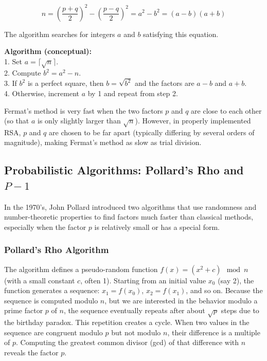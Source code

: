 \[
n = \left(\frac{p+q}{2}\right)^2 - \left(\frac{p-q}{2}\right)^2 = a^2 - b^2 = (a-b)(a+b)
\]

The algorithm searches for integers \(a\) and \(b\) satisfying this equation.

\textbf{Algorithm (conceptual):}
\\1. Set \(a = \lceil \sqrt{n} \rceil\).
\\2. Compute \(b^2 = a^2 - n\).
\\3. If \(b^2\) is a perfect square, then \(b = \sqrt{b^2}\) and the factors are \(a-b\) and \(a+b\).
\\4. Otherwise, increment \(a\) by 1 and repeat from step 2.

Fermat’s method is very fast when the two factors \(p\) and \(q\) are close to each other (so that \(a\) is only slightly larger than \(\sqrt{n}\)). However, in properly implemented RSA, \(p\) and \(q\) are chosen to be far apart (typically differing by several orders of magnitude), making Fermat’s method as slow as trial division.

\subsection{Probabilistic Algorithms: Pollard’s Rho and \(P-1\)}

In the 1970's, John Pollard introduced two algorithms that use randomness and number-theoretic properties to find factors much faster than classical methods, especially when the factor \(p\) is relatively small or has a special form.

\subsubsection{Pollard’s Rho Algorithm}

The algorithm defines a pseudo-random function \(f(x) = (x^2 + c) \mod n\) (with a small constant \(c\), often 1). Starting from an initial value \(x_0\) (say 2), the function generates a sequence: \(x_1 = f(x_0)\), \(x_2 = f(x_1)\), and so on. Because the sequence is computed modulo \(n\), but we are interested in the behavior modulo a prime factor \(p\) of \(n\), the sequence eventually repeats after about \(\sqrt{p}\) steps due to the birthday paradox. This repetition creates a cycle. When two values in the sequence are congruent modulo \(p\) but not modulo \(n\), their difference is a multiple of \(p\). Computing the greatest common divisor (gcd) of that difference with \(n\) reveals the factor \(p\).

